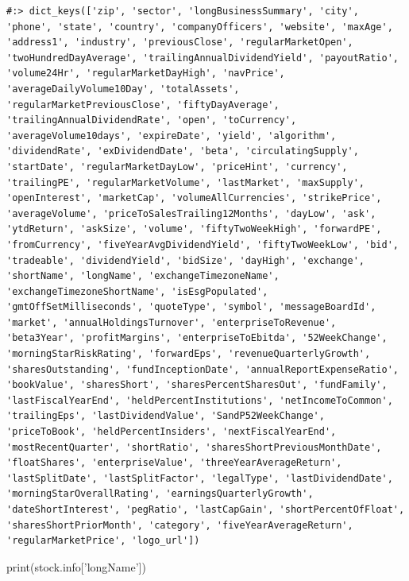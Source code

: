 \documentclass[
]{book}
\newenvironment{Shaded}{\begin{snugshade}}{\end{snugshade}}
\newcommand{\BuiltInTok}[1]{#1}
\newcommand{\NormalTok}[1]{#1}
\newcommand{\StringTok}[1]{\textcolor[rgb]{0.5,0.5,0.5}{#1}}
\begin{document}
\begin{verbatim}
#:> dict_keys(['zip', 'sector', 'longBusinessSummary', 'city', 'phone', 'state', 'country', 'companyOfficers', 'website', 'maxAge', 'address1', 'industry', 'previousClose', 'regularMarketOpen', 'twoHundredDayAverage', 'trailingAnnualDividendYield', 'payoutRatio', 'volume24Hr', 'regularMarketDayHigh', 'navPrice', 'averageDailyVolume10Day', 'totalAssets', 'regularMarketPreviousClose', 'fiftyDayAverage', 'trailingAnnualDividendRate', 'open', 'toCurrency', 'averageVolume10days', 'expireDate', 'yield', 'algorithm', 'dividendRate', 'exDividendDate', 'beta', 'circulatingSupply', 'startDate', 'regularMarketDayLow', 'priceHint', 'currency', 'trailingPE', 'regularMarketVolume', 'lastMarket', 'maxSupply', 'openInterest', 'marketCap', 'volumeAllCurrencies', 'strikePrice', 'averageVolume', 'priceToSalesTrailing12Months', 'dayLow', 'ask', 'ytdReturn', 'askSize', 'volume', 'fiftyTwoWeekHigh', 'forwardPE', 'fromCurrency', 'fiveYearAvgDividendYield', 'fiftyTwoWeekLow', 'bid', 'tradeable', 'dividendYield', 'bidSize', 'dayHigh', 'exchange', 'shortName', 'longName', 'exchangeTimezoneName', 'exchangeTimezoneShortName', 'isEsgPopulated', 'gmtOffSetMilliseconds', 'quoteType', 'symbol', 'messageBoardId', 'market', 'annualHoldingsTurnover', 'enterpriseToRevenue', 'beta3Year', 'profitMargins', 'enterpriseToEbitda', '52WeekChange', 'morningStarRiskRating', 'forwardEps', 'revenueQuarterlyGrowth', 'sharesOutstanding', 'fundInceptionDate', 'annualReportExpenseRatio', 'bookValue', 'sharesShort', 'sharesPercentSharesOut', 'fundFamily', 'lastFiscalYearEnd', 'heldPercentInstitutions', 'netIncomeToCommon', 'trailingEps', 'lastDividendValue', 'SandP52WeekChange', 'priceToBook', 'heldPercentInsiders', 'nextFiscalYearEnd', 'mostRecentQuarter', 'shortRatio', 'sharesShortPreviousMonthDate', 'floatShares', 'enterpriseValue', 'threeYearAverageReturn', 'lastSplitDate', 'lastSplitFactor', 'legalType', 'lastDividendDate', 'morningStarOverallRating', 'earningsQuarterlyGrowth', 'dateShortInterest', 'pegRatio', 'lastCapGain', 'shortPercentOfFloat', 'sharesShortPriorMonth', 'category', 'fiveYearAverageReturn', 'regularMarketPrice', 'logo_url'])
\end{verbatim}

\begin{Shaded}
\begin{Highlighting}[]
\BuiltInTok{print}\NormalTok{(stock.info[}\StringTok{'longName'}\NormalTok{])}
\end{Highlighting}
\end{Shaded}
\end{document}
